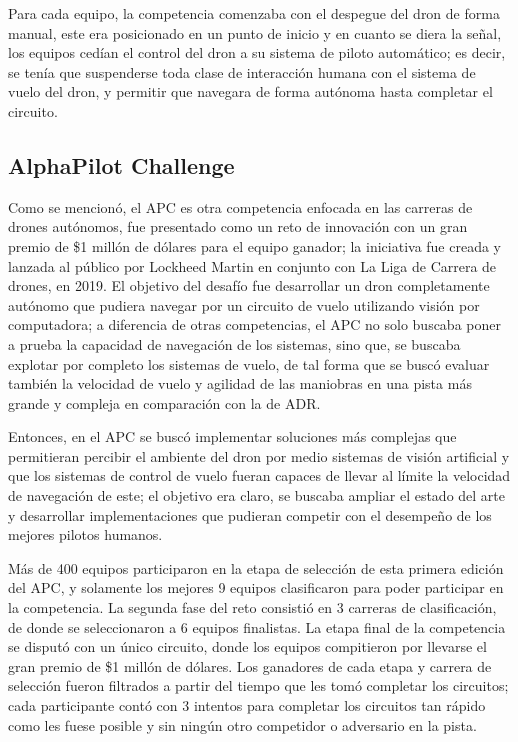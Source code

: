 Para cada equipo, la competencia comenzaba con el despegue del dron de forma manual, este era posicionado en un punto de inicio y en cuanto se diera la señal, los equipos cedían el control del dron a su sistema de piloto automático; es decir, se tenía que suspenderse toda clase de interacción humana con el sistema de vuelo del dron, y permitir que navegara de forma autónoma hasta completar el circuito. 

\subsection{AlphaPilot Challenge}
Como se mencionó, el APC es otra competencia enfocada en las carreras de drones autónomos, fue presentado como un reto de innovación con un gran premio de \$1 millón de dólares para el equipo ganador; la iniciativa fue creada y lanzada al público por Lockheed Martin en conjunto con La Liga de Carrera de drones, en 2019. El objetivo del desafío fue desarrollar un dron completamente autónomo que pudiera navegar por un circuito de vuelo utilizando visión por computadora; a diferencia de otras competencias, el APC no solo buscaba poner a prueba la capacidad de navegación de los sistemas, sino que, se buscaba explotar por completo los sistemas de vuelo, de tal forma que se buscó evaluar también la velocidad de vuelo y agilidad de las maniobras en una pista  más grande y compleja en comparación con la de ADR. 

Entonces, en el APC se buscó implementar soluciones más complejas que permitieran percibir el ambiente del dron por medio sistemas de visión artificial y que los sistemas de control de vuelo fueran capaces de llevar al límite la velocidad de navegación de este; el objetivo era claro, se buscaba ampliar el estado del arte y desarrollar implementaciones que pudieran competir con el desempeño de los mejores pilotos humanos. 

Más de 400 equipos participaron en la etapa de selección de esta primera edición del APC, y solamente los mejores 9 equipos clasificaron para poder participar en la competencia. La segunda fase del reto consistió en 3 carreras de clasificación, de donde se seleccionaron a 6 equipos finalistas. La etapa final de la competencia se disputó con un único circuito, donde los equipos compitieron por llevarse el gran premio de \$1 millón de dólares. Los ganadores de cada etapa y carrera de selección fueron filtrados a partir del tiempo que les tomó completar los circuitos; cada participante contó con 3 intentos para completar los circuitos tan rápido como les fuese posible y sin ningún otro competidor o adversario en la pista.

